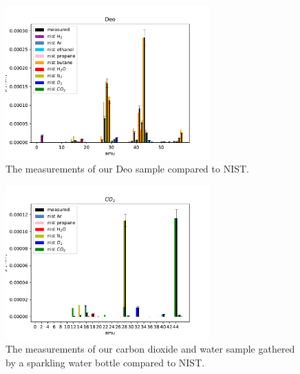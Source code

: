     \begin{figure}[h!]
    \centering
    \includegraphics[width=0.7\textwidth]{Report/DataResultsPlots/deo.pdf}
    \caption{The measurements of our Deo sample compared to NIST.}
    \label{fig:deo}
    \end{figure}
    
    
    \begin{figure}[h!]
    \centering
    \includegraphics[width=0.7\textwidth]{Report/DataResultsPlots/co2.pdf}
    \caption{The measurements of our carbon dioxide and water sample gathered by a sparkling water bottle compared to NIST.}
    \label{fig:deo}
    \end{figure}